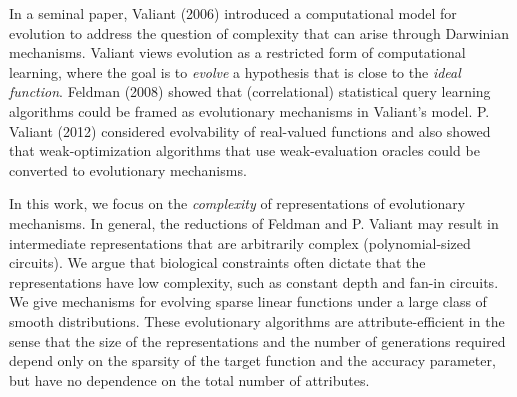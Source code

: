 In a seminal paper, Valiant (2006) introduced a computational model for
evolution to address the question of complexity that can arise through Darwinian
mechanisms. Valiant views evolution as a restricted form of computational
learning, where the goal is to \emph{evolve} a hypothesis that is close to the
\emph{ideal function}. Feldman (2008) showed that (correlational) statistical
query learning algorithms could be framed as evolutionary mechanisms in
Valiant's model. P. Valiant (2012) considered evolvability of real-valued
functions and also showed that weak-optimization algorithms that use
weak-evaluation oracles could be converted to evolutionary mechanisms.

In this work, we focus on the \emph{complexity} of representations of
evolutionary mechanisms. In general, the reductions of Feldman and P. Valiant
may result in intermediate representations that are arbitrarily complex
(polynomial-sized circuits). We argue that biological constraints often dictate
that the representations have low complexity, such as constant depth and fan-in
circuits. We give mechanisms for evolving sparse linear functions under a large
class of smooth distributions. These evolutionary algorithms are
attribute-efficient in the sense that the size of the representations and the
number of generations required depend only on the sparsity of the target
function and the accuracy parameter, but have no dependence on the total number of
attributes.
